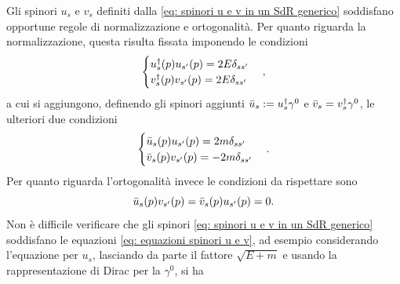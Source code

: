 Gli spinori $u_s$ e $v_s$ definiti dalla \eqref{eq: spinori u e v in un SdR generico} soddisfano opportune regole di normalizzazione e ortogonalità. Per quanto riguarda la normalizzazione, questa risulta fissata imponendo le condizioni
\begin{equation}
    \begin{cases}
        u_s^\dagger(p)u_{s'}(p) = 2E\delta_{ss'} \\
        v_s^\dagger(p)v_{s'}(p) = 2E\delta_{ss'}
    \end{cases},
\end{equation}
a cui si aggiungono, definendo gli spinori aggiunti $\bar{u}_s := u^\dagger_s\gamma^0$ e $\bar{v}_s = v^\dagger_s\gamma^0$, le ulteriori due condizioni
\begin{equation}
    \begin{cases}
        \bar{u}_s(p)u_{s'}(p) = 2m\delta_{ss'} \\
        \bar{v}_s(p)v_{s'}(p) = -2m\delta_{ss'}
    \end{cases}.
\end{equation}
Per quanto riguarda l'ortogonalità invece le condizioni da rispettare sono
\begin{equation}
    \bar{u}_s(p)v_{s'}(p) = \bar{v}_s(p)u_{s'}(p) = 0.
\end{equation}
Non è difficile verificare che gli spinori \eqref{eq: spinori u e v in un SdR generico} soddisfano le equazioni \eqref{eq: equazioni spinori u e v}, ad esempio considerando l'equazione per $u_s$, lasciando da parte il fattore $\sqrt{E + m}$ e usando la rappresentazione di Dirac per la $\gamma^0$, si ha
